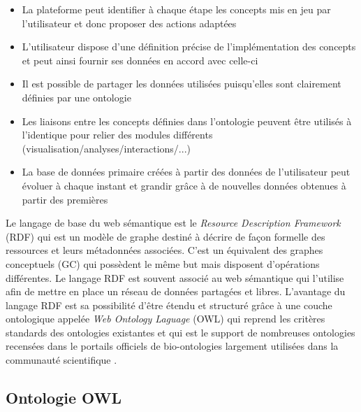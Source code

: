 \begin{itemize}
    \item La plateforme peut identifier à chaque étape les concepts mis en jeu par l'utilisateur et donc proposer des actions adaptées
    \item L'utilisateur dispose d'une définition précise de l'implémentation des concepts et peut ainsi fournir ses données en accord avec celle-ci
    \item Il est possible de partager les données utilisées puisqu'elles sont clairement définies par une ontologie
    \item Les liaisons entre les concepts définies dans l'ontologie peuvent être utilisés à l'identique pour relier des modules différents (visualisation/analyses/interactions/...)
    \item La base de données primaire créées à partir des données de l'utilisateur peut évoluer à chaque instant et grandir grâce à de nouvelles données obtenues à partir des premières
\end{itemize}

Le langage de base du web sémantique est le \textit{Resource Description Framework} (RDF) qui est un modèle de graphe destiné à décrire de façon formelle des ressources et leurs métadonnées associées. C'est un équivalent des graphes conceptuels (GC) qui possèdent le même but mais disposent d'opérations différentes. Le langage RDF est souvent associé au web sémantique qui l'utilise afin de mettre en place un réseau de données partagées et libres. L'avantage du langage RDF est sa possibilité d'être étendu et structuré grâce à une couche ontologique appelée \textit{Web Ontology Laguage} (OWL) qui reprend les critères standards des ontologies existantes et qui est le support de nombreuses ontologies recensées dans le portails officiels de bio-ontologies largement utilisées dans la communauté scientifique \cite{smith_obo_2007}.

\subsection{Ontologie OWL}

